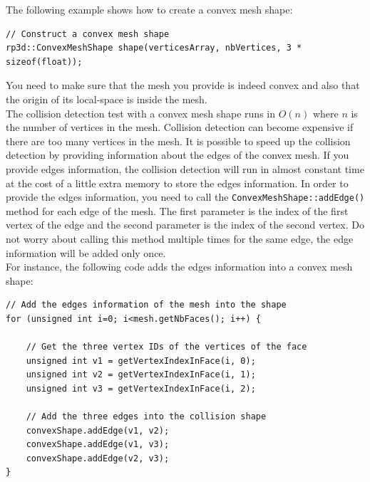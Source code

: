 \documentclass[a4paper,12pt]{article}
\begin{document}
    The following example shows how to create a convex mesh shape: \\

    \begin{lstlisting}
// Construct a convex mesh shape
rp3d::ConvexMeshShape shape(verticesArray, nbVertices, 3 * sizeof(float));
  \end{lstlisting}

    \vspace{0.6cm}

    You need to make sure that the mesh you provide is indeed convex and also that the origin of its local-space is inside the mesh. \\

    The collision detection test with a convex mesh shape runs in $O(n)$ where $n$ is the number of vertices in the mesh. Collision detection can become expensive if there are
    too many vertices in the mesh. It is possible to speed up the collision detection by providing information about the edges of the convex mesh. If you provide edges information, the collision detection will run in almost constant time at the cost of a little extra memory to store the edges information. In order to provide the edges
    information, you need to call the \texttt{ConvexMeshShape::addEdge()} method for each edge of the mesh. The first parameter is the index of the first vertex of the edge and the
    second parameter is the index of the second vertex. Do not worry about calling this method multiple times for the same edge, the edge information will be added only
    once. \\

    For instance, the following code adds the edges information into a convex mesh shape: \\

    \begin{lstlisting}
// Add the edges information of the mesh into the shape
for (unsigned int i=0; i<mesh.getNbFaces(); i++) {

    // Get the three vertex IDs of the vertices of the face
    unsigned int v1 = getVertexIndexInFace(i, 0);
    unsigned int v2 = getVertexIndexInFace(i, 1);
    unsigned int v3 = getVertexIndexInFace(i, 2);

    // Add the three edges into the collision shape
    convexShape.addEdge(v1, v2);
    convexShape.addEdge(v1, v3);
    convexShape.addEdge(v2, v3);
}
  \end{lstlisting}

    \vspace{0.6cm}
\end{document}
